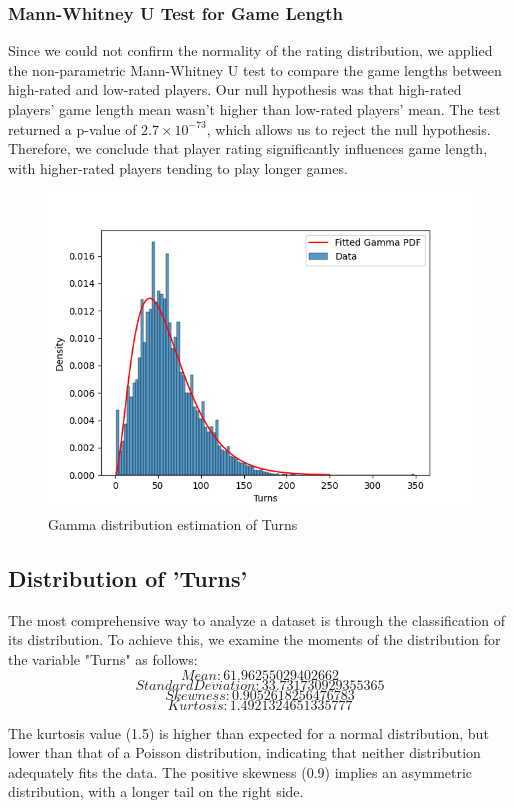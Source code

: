 \documentclass[conference]{IEEEtran}
\begin{document}
\subsubsection*{Mann-Whitney U Test for Game Length}
Since we could not confirm the normality of the rating distribution, we applied the non-parametric Mann-Whitney U test to compare the game lengths between high-rated and low-rated players. Our null hypothesis was that high-rated players' game length mean wasn't higher than low-rated players' mean. The test returned a p-value of \(2.7 \times 10^{-73}\), which allows us to reject the null hypothesis. Therefore, we conclude that player rating significantly influences game length, with higher-rated players tending to play longer games.


\begin{figure}[H]
    \centering
    \includegraphics[width=0.8\linewidth]{gamma_fit.png}
    \caption{Gamma distribution estimation of Turns}
    \label{fig:gamma_fit}
\end{figure}
\subsection{Distribution of 'Turns'}

The most comprehensive way to analyze a dataset is through the classification of its distribution. To achieve this, we examine the moments of the distribution for the variable "Turns" as follows:
\[Mean: 61.96255029402662\]
\[Standard Deviation: 33.731730929355365\]
\[Skewness: 0.9052618256476783\]
\[Kurtosis: 1.4921324651335777\]

The kurtosis value (1.5) is higher than expected for a normal distribution, but lower than that of a Poisson distribution, indicating that neither distribution adequately fits the data. The positive skewness (0.9) implies an asymmetric distribution, with a longer tail on the right side.
\end{document}
